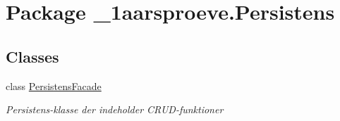 \hypertarget{namespace__1aarsproeve_1_1_persistens}{}\section{Package \+\_\+1aarsproeve.\+Persistens}
\label{namespace__1aarsproeve_1_1_persistens}
\subsection*{Classes}
\begin{DoxyCompactItemize}
\item 
class \hyperlink{class__1aarsproeve_1_1_persistens_1_1_persistens_facade}{Persistens\+Facade}
\begin{DoxyCompactList}\small\item\em Persistens-\/klasse der indeholder C\+R\+U\+D-\/funktioner \end{DoxyCompactList}\end{DoxyCompactItemize}
